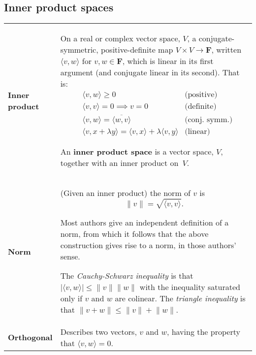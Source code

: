 \documentclass[10pt, a4paper, landscape]{article}
\newcommand{\defn}[1]{\textbf{#1}}
\newcommand{\set}[1]{\mathbold{#1}}
\newcommand{\inner}[2]{{\langle #1,#2 \rangle}}
\newcommand{\norm}[1]{{\lVert #1 \rVert}}
\newlength{\termheaderwd}
\begin{document}
\begin{multicols*}{3}
\section*{Inner product spaces}
\begin{tabularx}{\columnwidth}{@{}l>{\raggedright\arraybackslash}X@{}}
  \toprule
  \settowidth{\termheaderwd}{product}%
  \parbox[t]{\termheaderwd}{\defn{Inner\\ product}} 
  & On a real or complex vector space, $V$, a conjugate-symmetric, positive-definite map $V\times V\to\set{F}$, written $\langle v, w\rangle$ for $v, w\in\set{F}$, which is linear in its first argument (and conjugate linear in its second). That is: 
\begin{equation*}
    \begin{aligned}
      &\inner{v}{w} \geq 0                 & \text{(positive)}\\
      &\inner{v}{v} = 0 \implies v = 0  & \text{(definite)}\\
      &\langle v, w\rangle = \overline{\langle w, v\rangle}     & \text{(conj.\ symm.)} \\ 
      &\langle v, x+\lambda y\rangle = \langle v,x\rangle + \lambda \langle v, y\rangle & \text{(linear)} 
    \end{aligned}
    \end{equation*}

    An \defn{inner product space} is a vector space, $V$, together with an inner product on~$V$.\\
  \defn{Norm} & (Given an inner product) the norm of $v$ is
                \begin{equation*}
                  \lVert v\rVert = \sqrt{\inner{v}{v}}.
                \end{equation*}

                Most authors give an independent definition of a norm, from which it follows that the above construction gives rise to a norm, in those authors' sense.

                The \emph{Cauchy-Schwarz inequality} is that $\lvert \inner{v}{w}\rvert \leq \lVert v\rVert \lVert w \rVert$ with the inequality saturated only if $v$ and $w$ are colinear. The \emph{triangle inequality} is that $\norm{v+w}\leq\norm{v}+\norm{w}$.  \\
  \defn{Orthogonal} & Describes two vectors, $v$ and $w$, having the property that $\inner{v}{w} =0$. \\

\end{tabularx}



\end{multicols*}
\end{document}
